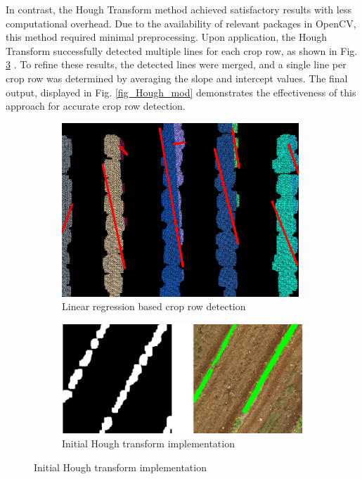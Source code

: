 \documentclass[conference]{IEEEtran}
\begin{document}
	In contrast, the Hough Transform method achieved satisfactory results with less computational overhead. Due to the availability of relevant packages in OpenCV, this method required minimal preprocessing. Upon application, the Hough Transform successfully detected multiple lines for each crop row, as shown in Fig. 
	\ref{fig_Hough_Init}
	. To refine these results, the detected lines were merged, and a single line per crop row was determined by averaging the slope and intercept values. The final output, displayed in Fig. 
	\ref{fig_Hough_mod} demonstrates the effectiveness of this approach for accurate crop row detection.
	
	\begin{figure}[t]
		\centering
		\begin{subfigure}{\linewidth}
			\centering
			\includegraphics[width=0.5\linewidth]{Kmeans_Row_Result.png}
			\caption{Linear regression based crop row detection}
			\label{fig_Linear_Regression}
		\end{subfigure}
		
		\vspace{0.5cm}
		
		\begin{subfigure}{\linewidth}
			\centering
			\includegraphics[width=0.7\linewidth]{Hough initial2.png}
			\caption{Initial Hough transform implementation}
			\label{fig_Hough_Init}
		\end{subfigure}
		
		\vspace{0.5cm} %
		

\end{figure}
\end{document}

